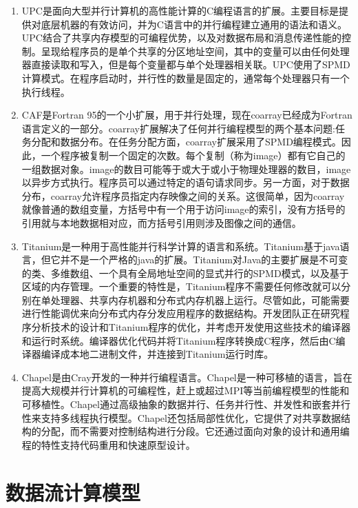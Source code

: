 \begin{enumerate}
	\item UPC是面向大型并行计算机的高性能计算的C编程语言的扩展\citep{upc}。主要目标是提供对底层机器的有效访问，并为C语言中的并行编程建立通用的语法和语义。UPC结合了共享内存模型的可编程优势，以及对数据布局和消息传递性能的控制。呈现给程序员的是单个共享的分区地址空间，其中的变量可以由任何处理器直接读取和写入，但是每个变量都与单个处理器相关联。UPC使用了SPMD计算模式。在程序启动时，并行性的数量是固定的，通常每个处理器只有一个执行线程。
	\item CAF是Fortran 95的一个小扩展，用于并行处理，现在coarray已经成为Fortran语言定义的一部分\citep{numrich2005co}。coarray扩展解决了任何并行编程模型的两个基本问题:任务分配和数据分布。在任务分配方面，coarray扩展采用了SPMD编程模式。因此，一个程序被复制一个固定的次数。每个复制（称为image）都有它自己的一组数据对象。image的数目可能等于或大于或小于物理处理器的数目，image以异步方式执行。程序员可以通过特定的语句请求同步。另一方面，对于数据分布，coarray允许程序员指定内存映像之间的关系。这很简单，因为coarray就像普通的数组变量，方括号中有一个用于访问image的索引，没有方括号的引用就与本地数据相对应，而方括号引用则涉及图像之间的通信。
	\item Titanium是一种用于高性能并行科学计算的语言和系统\citep{titanium}。Titanium基于java语言，但它并不是一个严格的java的扩展。Titanium对Java的主要扩展是不可变的类、多维数组、一个具有全局地址空间的显式并行的SPMD模式，以及基于区域的内存管理。一个重要的特性是，Titanium程序不需要任何修改就可以分别在单处理器、共享内存机器和分布式内存机器上运行。尽管如此，可能需要进行性能调优来向分布式内存分发应用程序的数据结构。开发团队正在研究程序分析技术的设计和Titanium程序的优化，并考虑开发使用这些技术的编译器和运行时系统。编译器优化代码并将Titanium程序转换成C程序，然后由C编译器编译成本地二进制文件，并连接到Titanium运行时库。
	\item Chapel是由Cray开发的一种并行编程语言\citep{chapel}。Chapel是一种可移植的语言，旨在提高大规模并行计算机的可编程性，赶上或超过MPI等当前编程模型的性能和可移植性。Chapel通过高级抽象的数据并行、任务并行性、并发性和嵌套并行性来支持多线程执行模型。Chapel还包括局部性优化，它提供了对共享数据结构的分配，而不需要对控制结构进行分段。它还通过面向对象的设计和通用编程的特性支持代码重用和快速原型设计。
\end{enumerate}

\section{数据流计算模型}

